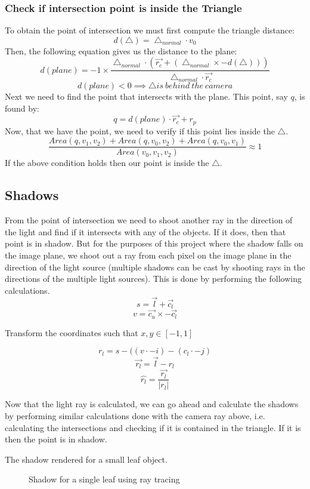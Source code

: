 \documentclass[paper=a4, fontsize=11pt]{scrartcl}
\numberwithin{equation}{section}		%
\numberwithin{figure}{section}			%
\numberwithin{table}{section}				%
\begin{document}
\subsubsection{Check if intersection point is inside the Triangle}
To obtain the point of intersection we must first compute the triangle distance:
\[d(\bigtriangleup) = \bigtriangleup_{normal} \cdot v_{0}\]
Then, the following equation gives us the distance to the plane:
\[d(plane) = -1 \times \dfrac{\bigtriangleup_{normal} \cdot (\overrightarrow{r_{c}} + (\bigtriangleup_{normal} \times -d(\bigtriangleup)))}{\bigtriangleup_{normal}\cdot \overrightarrow{r_{c}}}  \]
\[d(plane) < 0 \implies \bigtriangleup is\ behind\ the\ camera \]
Next we need to find the point that intersects with the plane.
This point, say $q$, is found by:
\[q = d(plane)\cdot\overrightarrow{r_{c}} + r_{p}\]
Now, that we have the point, we need to verify if this point lies inside the $\bigtriangleup$.
\[\dfrac{Area(q, v_{1}, v_{2}) + Area(q, v_{0}, v_{2}) + Area(q, v_{0}, v_{1})}{Area(v_{0}, v_{1}, v_{2})} \approx 1\]
If the above condition holds then our point is inside the $\bigtriangleup$.
\newpage
\subsection{Shadows}
From the point of intersection we need to shoot another ray in the direction of the light and find if it intersects with any of the objects. If it does, then that point is in shadow. But for the purposes of this project where the shadow falls on the image plane, we shoot out a ray from each pixel on the image plane in the direction of the light source (multiple shadows can be cast by shooting rays in the directions of the multiple light sources). This is done by performing the following calculations.
\[ s = \overrightarrow{l} + \overrightarrow{c_{l}} \]
\[ v = \overrightarrow{c_{u}} \times -\overrightarrow{c_{l}}\]

Transform the coordinates such that $x, y \in [-1, 1]$

\[ r_{l} = s - ((v \cdot -i) - (c_{l} \cdot -j) \]
\[ \overrightarrow{r_{l}} = \overrightarrow{l} - r_{l} \]
\[ \hat{r_{l}} = \dfrac{\overrightarrow{r_{l}}}{\lvert r_{l} \rvert} \]

Now that the light ray is calculated, we can go ahead and calculate the shadows by performing similar calculations done with the camera ray above, i.e. calculating the intersections and checking if it is contained in the triangle. If it is then the point is in shadow.
\par
The shadow rendered for a small leaf object.
\vspace{20pt}
\begin{figure}[h]
\centering
{}
\caption{Shadow for a single leaf using ray tracing}
\end{figure}
\end{document}

